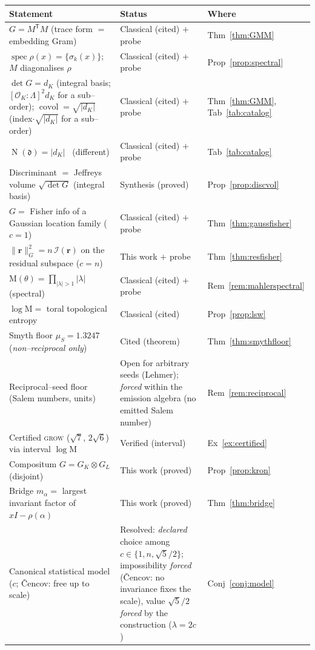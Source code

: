 \documentclass[11pt]{article}
\theoremstyle{plain}
\theoremstyle{definition}
\theoremstyle{remark}
\newcommand{\K}{K}
\newcommand{\OK}{\mathcal{O}_K}
\newcommand{\Nm}{\operatorname{N}}
\newcommand{\Mah}{\mathrm{M}}
\newcommand{\Fish}{\mathcal{I}}
\newcommand{\rr}{\mathbf{r}}
\newcommand{\GG}{G}
\newcommand{\transpose}{^{\mathsf{T}}}
\begin{document}
\begin{table}[ht]
\centering
\footnotesize
\begin{tabular}{p{} l l}
\toprule
Statement & Status & Where \\
\midrule
$\GG=M\transpose M$ (trace form $=$ embedding Gram) & Classical (cited) $+$ probe & Thm~\ref{thm:GMM} \\
$\operatorname{spec}\rho(x)=\{\sigma_k(x)\}$; $M$ diagonalises $\rho$ & Classical (cited) $+$ probe & Prop~\ref{prop:spectral} \\
$\det\GG=d_\K$ (integral basis; $[\OK\!:\!\Lambda]^2 d_\K$ for a sub--order); $\operatorname{covol}=\sqrt{|d_\K|}$ (index$\cdot\sqrt{|d_\K|}$ for a sub--order) & Classical (cited) $+$ probe & Thm~\ref{thm:GMM}, Tab~\ref{tab:catalog} \\
$\Nm(\mathfrak d)=|d_\K|$ \ (different) & Classical (cited) $+$ probe & Tab~\ref{tab:catalog} \\
Discriminant $=$ Jeffreys volume $\sqrt{\det\GG}$ (integral basis) & Synthesis (proved) & Prop~\ref{prop:discvol} \\
$\GG=$ Fisher info of a Gaussian location family ($c=1$) & Classical (cited) $+$ probe & Thm~\ref{thm:gaussfisher} \\
$\lVert\rr\rVert_{\GG}^2=n\,\Fish(\rr)$ on the residual subspace ($c=n$) & This work $+$ probe & Thm~\ref{thm:resfisher} \\
$\Mah(\theta)=\prod_{|\lambda|>1}|\lambda|$ (spectral) & Classical (cited) $+$ probe & Rem~\ref{rem:mahlerspectral} \\
$\log\Mah=$ toral topological entropy & Classical (cited) & Prop~\ref{prop:lsw} \\
Smyth floor $\mu_S=1.3247$ (\emph{non--reciprocal only}) & Cited (theorem) & Thm~\ref{thm:smythfloor} \\
Reciprocal--seed floor (Salem numbers, units) & Open for arbitrary seeds (Lehmer); \emph{forced} within the emission algebra (no emitted Salem number) & Rem~\ref{rem:reciprocal} \\
Certified \textsc{grow} ($\sqrt7$, $2\sqrt6$) via interval $\log\Mah$ & Verified (interval) & Ex~\ref{ex:certified} \\
Compositum $\GG=\GG_\K\otimes\GG_L$ (disjoint) & This work (proved) & Prop~\ref{prop:kron} \\
Bridge $m_\alpha=$ largest invariant factor of $xI-\rho(\alpha)$ & This work (proved) & Thm~\ref{thm:bridge} \\
Canonical statistical model ($c$; \v{C}encov: free up to scale) & Resolved: \emph{declared} choice among $c\in\{1,n,\sqrt5/2\}$; impossibility \emph{forced} (\v{C}encov: no invariance fixes the scale), value $\sqrt5/2$ \emph{forced} by the construction ($\lambda=2c$) & Conj~\ref{conj:model} \\

\end{tabular}
\end{table}
\end{document}
